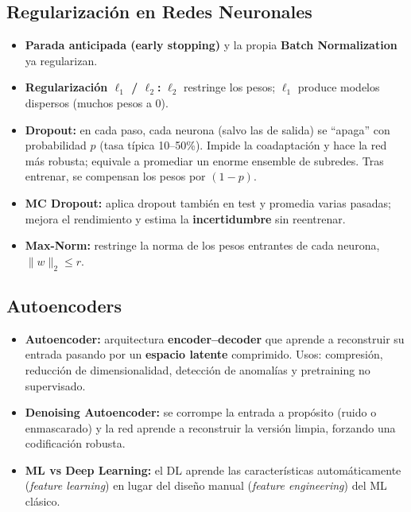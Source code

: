 \documentclass[12pt]{book} %
\providecommand{\tightlist}{%
  \setlength{\itemsep}{0pt}\setlength{\parskip}{0pt}}
\begin{document}
\hypertarget{regularizaciuxf3n-en-redes-neuronales}{%
\subsection{Regularización en Redes
Neuronales}\label{regularizaciuxf3n-en-redes-neuronales}}

\begin{itemize}
\tightlist
\item
  \textbf{Parada anticipada (early stopping)} y la propia \textbf{Batch
  Normalization} ya regularizan.
\item
  \textbf{Regularización \(\ell_1\) / \(\ell_2\):} \(\ell_2\) restringe
  los pesos; \(\ell_1\) produce modelos dispersos (muchos pesos a 0).
\item
  \textbf{Dropout:} en cada paso, cada neurona (salvo las de salida) se
  ``apaga'' con probabilidad \(p\) (tasa típica 10--50\%). Impide la
  coadaptación y hace la red más robusta; equivale a promediar un enorme
  ensemble de subredes. Tras entrenar, se compensan los pesos por
  \((1-p)\).
\item
  \textbf{MC Dropout:} aplica dropout también en test y promedia varias
  pasadas; mejora el rendimiento y estima la \textbf{incertidumbre} sin
  reentrenar.
\item
  \textbf{Max-Norm:} restringe la norma de los pesos entrantes de cada
  neurona, \(\lVert w \rVert_2 \le r\).
\end{itemize}

\hypertarget{autoencoders}{%
\subsection{Autoencoders}\label{autoencoders}}

\begin{itemize}
\tightlist
\item
  \textbf{Autoencoder:} arquitectura \textbf{encoder--decoder} que
  aprende a reconstruir su entrada pasando por un \textbf{espacio
  latente} comprimido. Usos: compresión, reducción de dimensionalidad,
  detección de anomalías y pretraining no supervisado.
\item
  \textbf{Denoising Autoencoder:} se corrompe la entrada a propósito
  (ruido o enmascarado) y la red aprende a reconstruir la versión
  limpia, forzando una codificación robusta.
\item
  \textbf{ML vs Deep Learning:} el DL aprende las características
  automáticamente (\emph{feature learning}) en lugar del diseño manual
  (\emph{feature engineering}) del ML clásico.
\end{itemize}
\end{document}
